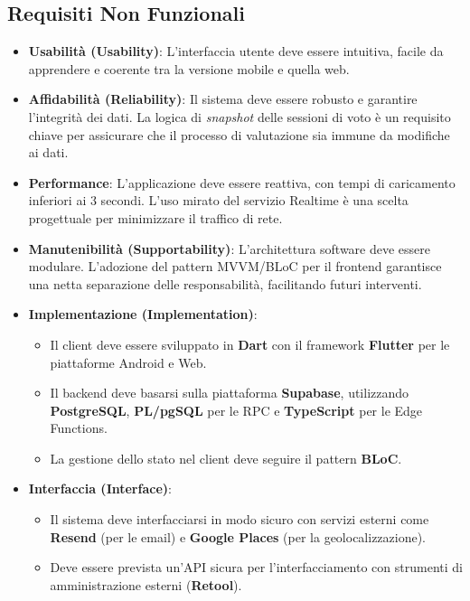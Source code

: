 \subsection{Requisiti Non Funzionali}\label{subsec:requisiti-non-funzionali}
\begin{itemize}
	\item \textbf{Usabilità (Usability)}: L'interfaccia utente deve essere intuitiva, facile da apprendere e coerente tra la versione mobile e quella web.
	
	\item \textbf{Affidabilità (Reliability)}: Il sistema deve essere robusto e garantire l'integrità dei dati.
	La logica di \emph{snapshot} delle sessioni di voto è un requisito chiave per assicurare che il processo di valutazione sia immune da modifiche ai dati.
	
	\item \textbf{Performance}: L'applicazione deve essere reattiva, con tempi di caricamento inferiori ai 3 secondi.
	L'uso mirato del servizio Realtime è una scelta progettuale per minimizzare il traffico di rete.
	
	\item \textbf{Manutenibilità (Supportability)}: L'architettura software deve essere modulare.
	L'adozione del pattern MVVM/BLoC per il frontend garantisce una netta separazione delle responsabilità, facilitando futuri interventi.
	
	\item \textbf{Implementazione (Implementation)}:
	\begin{itemize}
		\item Il client deve essere sviluppato in \textbf{Dart} con il framework \textbf{Flutter} per le piattaforme Android e Web.
        \item Il backend deve basarsi sulla piattaforma \textbf{Supabase}, utilizzando \textbf{PostgreSQL}, \textbf{PL/pgSQL} per le RPC e \textbf{TypeScript} per le Edge Functions.
        \item La gestione dello stato nel client deve seguire il pattern \textbf{BLoC}.
	\end{itemize}
	
	\item \textbf{Interfaccia (Interface)}:
	\begin{itemize}
		\item Il sistema deve interfacciarsi in modo sicuro con servizi esterni come \textbf{Resend} (per le email) e \textbf{Google Places} (per la geolocalizzazione).
        \item Deve essere prevista un'API sicura per l'interfacciamento con strumenti di amministrazione esterni (\textbf{Retool}).
	\end{itemize}
	

\end{itemize}
